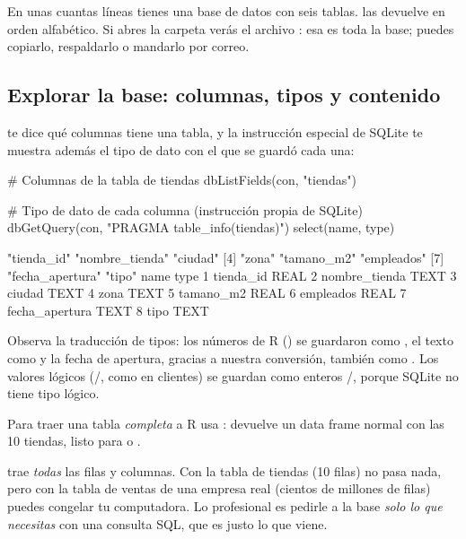 En unas cuantas líneas tienes una base de datos con seis tablas.
 las devuelve en orden alfabético. Si abres la
carpeta  verás el archivo : esa es
toda la base; puedes copiarlo, respaldarlo o mandarlo por correo.

\subsection{Explorar la base: columnas, tipos y contenido}

 te dice qué columnas tiene una tabla, y la
instrucción especial de SQLite  te muestra
además el tipo de dato con el que se guardó cada una:

\begin{rcode}
# Columnas de la tabla de tiendas
dbListFields(con, "tiendas")

# Tipo de dato de cada columna (instrucción propia de SQLite)
dbGetQuery(con, "PRAGMA table_info(tiendas)") %
  select(name, type)
\end{rcode}

\begin{rsalida}
[1] "tienda_id"      "nombre_tienda"  "ciudad"        
[4] "zona"           "tamano_m2"      "empleados"     
[7] "fecha_apertura" "tipo"          
            name type
1      tienda_id REAL
2  nombre_tienda TEXT
3         ciudad TEXT
4           zona TEXT
5      tamano_m2 REAL
6      empleados REAL
7 fecha_apertura TEXT
8           tipo TEXT
\end{rsalida}

Observa la traducción de tipos: los números de R () se
guardaron como , el texto como  y la fecha de
apertura, gracias a nuestra conversión, también como . Los
valores lógicos (/, como  en
clientes) se guardan como enteros /, porque SQLite no
tiene tipo lógico.

{\sloppy Para traer una tabla \emph{completa} a R usa :
 devuelve un data frame
normal con las 10 tiendas, listo para  o .\par}

\begin{advertencia}
 trae \emph{todas} las filas y columnas. Con la tabla
de tiendas (10 filas) no pasa nada, pero con la tabla de ventas de una
empresa real (cientos de millones de filas) puedes congelar tu computadora.
Lo profesional es pedirle a la base \emph{solo lo que necesitas} con una
consulta SQL, que es justo lo que viene.
\end{advertencia}

